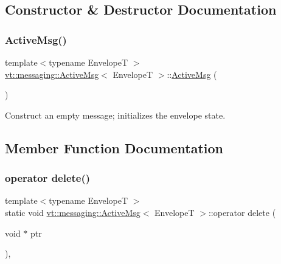 \subsection{Constructor \& Destructor Documentation}
\mbox{\label{structvt_1_1messaging_1_1_active_msg_a5fd6a7b78c86b8f1e36198142990a4c4}} 
\subsubsection{\texorpdfstring{Active\+Msg()}{ActiveMsg()}}
{\footnotesize\ttfamily template$<$typename EnvelopeT $>$ \\
\hyperlink{structvt_1_1messaging_1_1_active_msg}{vt\+::messaging\+::\+Active\+Msg}$<$ EnvelopeT $>$\+::\hyperlink{structvt_1_1messaging_1_1_active_msg}{Active\+Msg} (\begin{DoxyParamCaption}{ }\end{DoxyParamCaption})\hspace{0.3cm}{\ttfamily [inline]}}



Construct an empty message; initializes the envelope state. 



\subsection{Member Function Documentation}
\mbox{\label{structvt_1_1messaging_1_1_active_msg_a37cd0731f99157266333772f501d390d}} 
\subsubsection{\texorpdfstring{operator delete()}{operator delete()}}
{\footnotesize\ttfamily template$<$typename EnvelopeT $>$ \\
static void \hyperlink{structvt_1_1messaging_1_1_active_msg}{vt\+::messaging\+::\+Active\+Msg}$<$ EnvelopeT $>$\+::operator delete (\begin{DoxyParamCaption}\item[{void $\ast$}]{ptr }\end{DoxyParamCaption})\hspace{0.3cm}{\ttfamily [inline]}, {\ttfamily [static]}}



